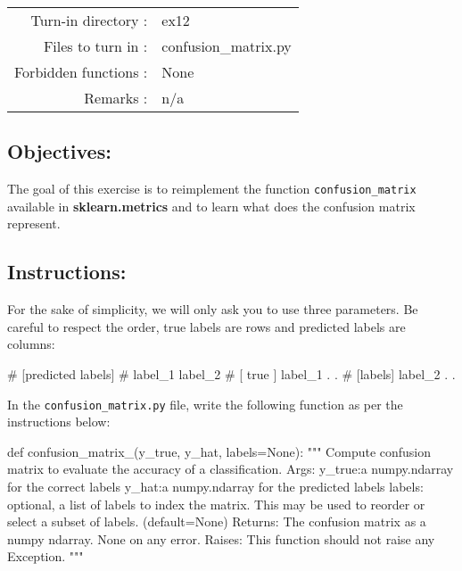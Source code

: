 \documentclass[]{article}
\newenvironment{Shaded}{\begin{snugshade}}{\end{snugshade}}
\newcommand{\CommentTok}[1]{\textcolor[rgb]{0.48,0.49,0.49}{#1}}
\newcommand{\KeywordTok}[1]{\textcolor[rgb]{0.81,0.81,0.76}{#1}}
\newcommand{\NormalTok}[1]{\textcolor[rgb]{0.81,0.81,0.76}{#1}}
\newcommand{\OperatorTok}[1]{\textcolor[rgb]{0.81,0.81,0.76}{#1}}
\newcommand{\VariableTok}[1]{\textcolor[rgb]{0.15,0.68,0.68}{#1}}
\begin{document}
\begin{longtable}[]{@{}rl@{}}
\toprule
\endhead
Turn-in directory : & ex12\tabularnewline
Files to turn in : & confusion\_matrix.py\tabularnewline
Forbidden functions : & None\tabularnewline
Remarks : & n/a\tabularnewline
\bottomrule
\end{longtable}

\hypertarget{objectives-11}{%
\subsection{Objectives:}\label{objectives-11}}

The goal of this exercise is to reimplement the function
\texttt{confusion\_matrix} available in \textbf{sklearn.metrics} and to
learn what does the confusion matrix represent.

\hypertarget{instructions-11}{%
\subsection{Instructions:}\label{instructions-11}}

For the sake of simplicity, we will only ask you to use three
parameters. Be careful to respect the order, true labels are rows and
predicted labels are columns:

\begin{Shaded}
\begin{Highlighting}[]
\NormalTok{# [predicted labels]    }
\NormalTok{# label_1  label_2}
\NormalTok{# [ true ]  label_1         .        .}
\NormalTok{# [labels]  label_2         .        .}
\end{Highlighting}
\end{Shaded}

In the \texttt{confusion\_matrix.py} file, write the following function
as per the instructions below:

\begin{Shaded}
\begin{Highlighting}[]
\KeywordTok{def}\NormalTok{ confusion_matrix_(y_true, y_hat, labels}\OperatorTok{=}\VariableTok{None}\NormalTok{):}
    \CommentTok{"""}
\CommentTok{    Compute confusion matrix to evaluate the accuracy of a classification.}
\CommentTok{    Args:}
\CommentTok{        y_true:a numpy.ndarray for the correct labels}
\CommentTok{        y_hat:a numpy.ndarray for the predicted labels}
\CommentTok{        labels: optional, a list of labels to index the matrix. This may be used to reorder or select a subset of labels. (default=None)}
\CommentTok{    Returns: }
\CommentTok{        The confusion matrix as a numpy ndarray.}
\CommentTok{        None on any error.}
\CommentTok{    Raises:}
\CommentTok{        This function should not raise any Exception.}
\CommentTok{    """}
\end{Highlighting}
\end{Shaded}
\end{document}
